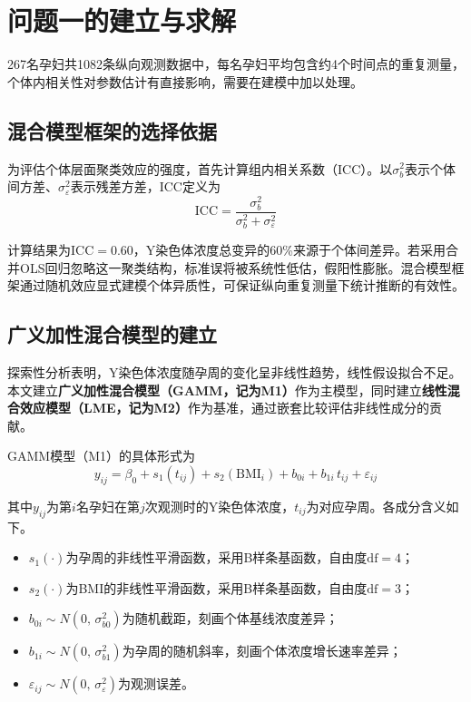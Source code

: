 \section{问题一的建立与求解}

267名孕妇共1082条纵向观测数据中，每名孕妇平均包含约4个时间点的重复测量，个体内相关性对参数估计有直接影响，需要在建模中加以处理。

\subsection{混合模型框架的选择依据}

为评估个体层面聚类效应的强度，首先计算组内相关系数（ICC）。以$\sigma^2_b$表示个体间方差、$\sigma^2_\varepsilon$表示残差方差，ICC定义为
\begin{equation}
  \mathrm{ICC} = \frac{\sigma^2_b}{\sigma^2_b + \sigma^2_\varepsilon}
\end{equation}

计算结果为$\mathrm{ICC}=0.60$，Y染色体浓度总变异的60\%来源于个体间差异。若采用合并OLS回归忽略这一聚类结构，标准误将被系统性低估，假阳性膨胀。混合模型框架通过随机效应显式建模个体异质性，可保证纵向重复测量下统计推断的有效性。

\subsection{广义加性混合模型的建立}

探索性分析表明，Y染色体浓度随孕周的变化呈非线性趋势，线性假设拟合不足。本文建立\textbf{广义加性混合模型（GAMM，记为M1）}作为主模型，同时建立\textbf{线性混合效应模型（LME，记为M2）}作为基准，通过嵌套比较评估非线性成分的贡献。

GAMM模型（M1）的具体形式为
\begin{equation}\label{eq:gamm}
  y_{ij} = \beta_0 + s_1(t_{ij}) + s_2(\mathrm{BMI}_i) + b_{0i} + b_{1i}\,t_{ij} + \varepsilon_{ij}
\end{equation}

其中$y_{ij}$为第$i$名孕妇在第$j$次观测时的Y染色体浓度，$t_{ij}$为对应孕周。各成分含义如下。

\begin{itemize}
  \item $s_1(\cdot)$为孕周的非线性平滑函数，采用B样条基函数，自由度$\mathrm{df}=4$；
  \item $s_2(\cdot)$为BMI的非线性平滑函数，采用B样条基函数，自由度$\mathrm{df}=3$；
  \item $b_{0i} \sim N(0,\,\sigma^2_{b0})$为随机截距，刻画个体基线浓度差异；
  \item $b_{1i} \sim N(0,\,\sigma^2_{b1})$为孕周的随机斜率，刻画个体浓度增长速率差异；
  \item $\varepsilon_{ij} \sim N(0,\,\sigma^2_\varepsilon)$为观测误差。
\end{itemize}


